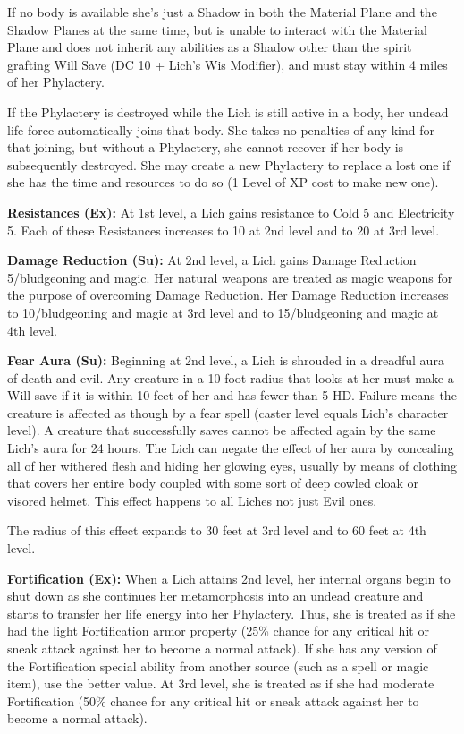 If no body is available she's just a Shadow in both the Material Plane and the Shadow Planes at the same time, but is unable to interact with the Material Plane and does not inherit any abilities as a Shadow other than the spirit grafting Will Save (DC 10 + Lich's Wis Modifier), and must stay within 4 miles of her Phylactery.

If the Phylactery is destroyed while the Lich is still active in a body, her undead life force automatically joins that body. She takes no penalties of any kind for that joining, but without a Phylactery, she cannot recover if her body is subsequently destroyed. She may create a new Phylactery to replace a lost one if she has the time and resources to do so (1 Level of XP cost to make new one).

\textbf{Resistances (Ex):} At 1st level, a Lich gains resistance to Cold 5 and Electricity 5. Each of these Resistances increases to 10 at 2nd level and to 20 at 3rd level.

\textbf{Damage Reduction (Su):} At 2nd level, a Lich gains Damage Reduction 5/bludgeoning and magic. Her natural weapons are treated as magic weapons for the purpose of overcoming Damage Reduction. Her Damage Reduction increases to 10/bludgeoning and magic at 3rd level and to 15/bludgeoning and magic at 4th level.

\textbf{Fear Aura (Su):} Beginning at 2nd level, a Lich is shrouded in a dreadful aura of death and evil. Any creature in a 10-foot radius that looks at her must make a Will save if it is within 10 feet of her and has fewer than 5 HD. Failure means the creature is affected as though by a fear spell (caster level equals Lich's character level). A creature that successfully saves cannot be affected again by the same Lich's aura for 24 hours. The Lich can negate the effect of her aura by concealing all of her withered flesh and hiding her glowing eyes, usually by means of clothing that covers her entire body coupled with some sort of deep cowled cloak or visored helmet. This effect happens to all Liches not just Evil ones.

The radius of this effect expands to 30 feet at 3rd level and to 60 feet at 4th level.

\textbf{Fortification (Ex):} When a Lich attains 2nd level, her internal organs begin to shut down as she continues her metamorphosis into an undead creature and starts to transfer her life energy into her Phylactery. Thus, she is treated as if she had the light Fortification armor property (25\% chance for any critical hit or sneak attack against her to become a normal attack). If she has any version of the Fortification special ability from another source (such as a spell or magic item), use the better value. At 3rd level, she is treated as if she had moderate Fortification (50\% chance for any critical hit or sneak attack against her to become a normal attack).

